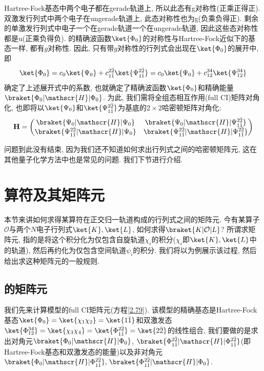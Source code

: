 Hartree-Fock基态中两个电子都在gerade轨道上, 
所以此态有g对称性(正乘正得正). 
双激发行列式中两个电子在ungerade轨道上, 
此态对称性也为g(负乘负得正). 
剩余的单激发行列式中电子一个在gerade轨道一个在ungerade轨道, 
因此这些态对称性都是u(正乘负得负). 
的精确波函数$\ket{\Phi_0}$的对称性与Hartree-Fock近似下的基态一样, 
都有$g$对称性. 
因此, 
只有带$g$对称性的行列式会出现在$\ket{\Phi_0}$的展开中, 
即
\begin{equation}
\ket{\Phi_0}=c_0\ket{\Psi_0} + c_{1\bar{1}}^{2\bar{2}}\ket{\Psi_{1\bar{1}}^{2\bar{2}}}=c_0\ket{\Psi_0} + c_{12}^{34}\ket{\Psi_{12}^{34}}
\end{equation}
确定了上述展开式中的系数, 
也就确定了精确波函数$\ket{\Phi_0}$和精确能量$\braket{\Phi_0|\mathscr{H}|\Phi_0}$. 
为此, 
我们需将全组态相互作用(full CI)矩阵对角化, 
也即将以$\ket{\Psi_0}$和$\ket{\Psi_{1\bar{1}}^{2\bar{2}}}$为基底的$2\times 2$哈密顿矩阵对角化:
\begin{equation}
	\label{2.79}
	\mathbf{H}=
	\begin{pmatrix}
		\braket{{\Psi_0}|\mathscr{H} | {\Psi_0}} & \braket{{\Psi_0} |\mathscr{H} |{\Psi_{1\bar{1}}^{2\bar{2}}}}\\
		\braket{{\Psi_{1\bar{1}}^{2\bar{2}}}|\mathscr{H} | {\Psi_0}} & \braket{{\Psi_{1\bar{1}}^{2\bar{2}}} |\mathscr{H} |{\Psi_{1\bar{1}}^{2\bar{2}}}}
	\end{pmatrix}
\end{equation}

问题到此没有结束, 
因为我们还不知道如何求出行列式之间的哈密顿矩阵元, 
这在其他量子化学方法中也是常见的问题. 
我们下节进行介绍.


\section{算符及其矩阵元}
 \label{sec2.3}
本节来讲如何求得某算符在正交归一轨道构成的行列式之间的矩阵元. 
今有某算子$\mathcal{O}$与两个$N$电子行列式$\ket{K},\ket{L}$, 
如何求得$\braket{K|\mathcal{O}|L}$? 所谓求矩阵元, 
指的是将这个积分化为仅包含自旋轨道$\chi_i$的积分($\chi_i$即$\ket{K},\ket{L}$中的轨道), 
然后再约化为仅包含空间轨道$\psi_i$的积分. 
 我们将以为例展示该过程, 
然后给出求这种矩阵元的一般规则.


\subsection{\texorpdfstring{}{极小基H₂}的矩阵元}
 \label{sec2.3.1}
我们先来计算模型的full CI矩阵元(方程\autoref{2.79}). 
该模型的精确基态是Hartree-Fock基态$\ket{\Phi_0}=\ket{\chi_1\chi_2}=\ket{1\bar{1}}$和双激发态$\ket{\Phi_{12}^{34}}=\ket{\chi_3\chi_4}=\ket{\Phi_{1\bar{1}}^{2\bar{2}}}=\ket{2\bar{2}}$的线性组合, 
我们要做的是求出对角元$\braket{{\Phi_0}|\mathscr{H} | {\Phi_0}}$, 
$\braket{{\Phi_{1\bar{1}}^{2\bar{2}}} |\mathscr{H} |{\Phi_{1\bar{1}}^{2\bar{2}}}}$(即Hartree-Fock基态和双激发态的能量)以及非对角元$\braket{{\Phi_0} |\mathscr{H} |{\Phi_{1\bar{1}}^{2\bar{2}}}},$$\,\braket{{\Phi_{1\bar{1}}^{2\bar{2}}}|\mathscr{H} | {\Phi_0}}$.


